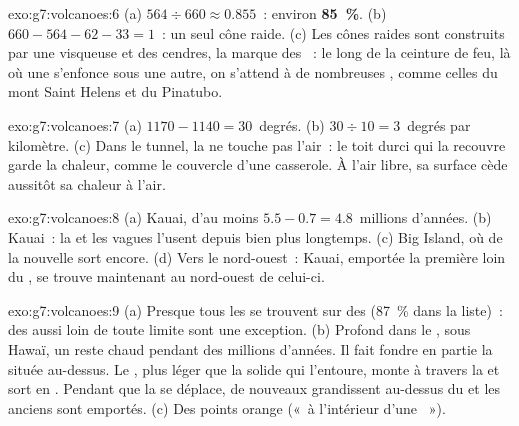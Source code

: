 \begin{solution}{exo:g7:volcanoes:6}
(a) $564 \div 660 \approx 0.855$~: environ \textbf{85~\%}. (b)
$660 - 564 - 62 - 33 = 1$~: un seul cône raide. (c) Les cônes raides sont
construits par une  visqueuse et des cendres, la marque des ~: le long de la ceinture de feu, là où une  s'enfonce
sous une autre, on s'attend à de nombreuses , comme
celles du mont Saint Helens et du Pinatubo.
\end{solution}

\begin{solution}{exo:g7:volcanoes:7}
(a) $1170 - 1140 = 30$~degrés. (b) $30 \div 10 = 3$~degrés par
kilomètre. (c) Dans le tunnel, la  ne touche pas l'air~: le toit durci
qui la recouvre garde la chaleur, comme le couvercle d'une casserole. À
l'air libre, sa surface cède aussitôt sa chaleur à l'air.
\end{solution}

\begin{solution}{exo:g7:volcanoes:8}
(a) Kauai, d'au moins $5.5 - 0.7 = 4.8$~millions d'années. (b) Kauai~: la
 et les vagues l'usent depuis bien plus longtemps. (c) Big Island, où
de la  nouvelle sort encore. (d) Vers le nord-ouest~: Kauai, emportée
la première loin du , se trouve maintenant au nord-ouest de
celui-ci.
\end{solution}

\begin{solution}{exo:g7:volcanoes:9}
(a) Presque tous les  se trouvent sur des 
(87~\% dans la liste)~: des  aussi loin de toute limite sont une
exception. (b) Profond dans le , sous Hawaï, un  reste
chaud pendant des millions d'années. Il fait fondre en partie la 
située au-dessus. Le , plus léger que la  solide qui l'entoure,
monte à travers la  et sort en . Pendant que la  se
déplace, de nouveaux  grandissent au-dessus du  et les
anciens sont emportés. (c) Des points orange («~à l'intérieur d'une
~»).
\end{solution}

